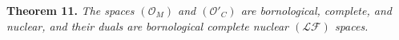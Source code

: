 \documentclass[british]{article}
\newenvironment{itenv}[1]
  {\phantomsection\par\smallskip\noindent\textbf{#1.}\itshape}
  {\par\smallskip}
\begin{document}
\protect{}\label{section-2-theorem-11}
\begin{itenv}{Theorem 11}
The spaces \((\mathscr{O}_M)\) and \((\mathscr{O}'_C)\) are
bornological, complete, and nuclear, and their duals are bornological
complete nuclear \((\mathscr{LF})\) spaces.

\end{itenv}


\nocite{*}
\printbibliography[heading=bibintoc,title=Bibliography]
\end{document}
